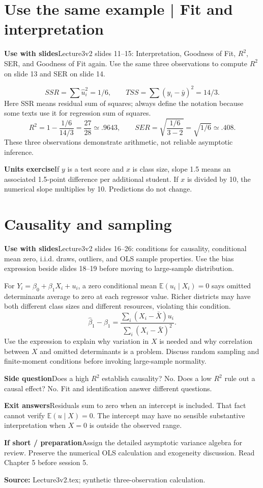 \documentclass[11pt,a4paper]{article}
\newcommand{\heading}[1]{\section*{\color{accent}#1}}
\newcommand{\cue}[2]{\par\noindent\textbf{#1}\quad #2\par}
\newcommand{\E}{\mathbb{E}}
\begin{document}
\newpage
\heading{Use the same example | Fit and interpretation}
\cue{Use with slides}{Lecture3v2 slides 11--15: Interpretation, Goodness of Fit, $R^2$, SER, and Goodness of Fit again. Use the same three observations to compute $R^2$ on slide 13 and SER on slide 14.}
\[
SSR=\sum\hat u_i^2=1/6,\qquad
TSS=\sum(y_i-\bar y)^2=14/3.
\]
Here SSR means residual sum of squares; always define the notation because some texts use it for regression sum of squares.
\[
R^2=1-\frac{1/6}{14/3}=\frac{27}{28}\simeq.9643,
\qquad SER=\sqrt{\frac{1/6}{3-2}}=\sqrt{1/6}\simeq.408.
\]
These three observations demonstrate arithmetic, not reliable asymptotic inference.
\cue{Units exercise}{If $y$ is a test score and $x$ is class size, slope 1.5 means an associated 1.5-point difference per additional student. If $x$ is divided by 10, the numerical slope multiplies by 10. Predictions do not change.}
\heading{Causality and sampling}
\cue{Use with slides}{Lecture3v2 slides 16--26: conditions for causality, conditional mean zero, i.i.d. draws, outliers, and OLS sample properties. Use the bias expression beside slides 18--19 before moving to large-sample distribution.}
For $Y_i=\beta_0+\beta_1X_i+u_i$, a zero conditional mean $\E(u_i\mid X_i)=0$ says omitted determinants average to zero at each regressor value. Richer districts may have both different class sizes and different resources, violating this condition.
\[
\hat\beta_1-\beta_1=
\frac{\sum_i(X_i-\bar X)u_i}{\sum_i(X_i-\bar X)^2}.
\]
Use the expression to explain why variation in $X$ is needed and why correlation between $X$ and omitted determinants is a problem. Discuss random sampling and finite-moment conditions before invoking large-sample normality.
\cue{Side question}{Does a high $R^2$ establish causality? No. Does a low $R^2$ rule out a causal effect? No. Fit and identification answer different questions.}
\cue{Exit answers}{Residuals sum to zero when an intercept is included. That fact cannot verify $\E(u\mid X)=0$. The intercept may have no sensible substantive interpretation when $X=0$ is outside the observed range.}
\cue{If short / preparation}{Assign the detailed asymptotic variance algebra for review. Preserve the numerical OLS calculation and exogeneity discussion. Read Chapter 5 before session 5.}
\textbf{Source:} Lecture3v2.tex; synthetic three-observation calculation.
\end{document}
